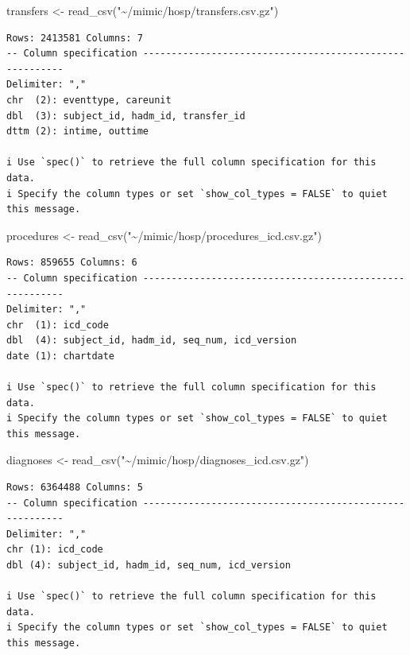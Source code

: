\documentclass[
]{article}
\newenvironment{Shaded}{\begin{snugshade}}{\end{snugshade}}
\newcommand{\FunctionTok}[1]{\textcolor[rgb]{0.00,0.00,0.00}{#1}}
\newcommand{\NormalTok}[1]{\textcolor[rgb]{0.00,0.00,0.00}{#1}}
\newcommand{\OtherTok}[1]{\textcolor[rgb]{0.56,0.35,0.01}{#1}}
\newcommand{\StringTok}[1]{\textcolor[rgb]{0.31,0.60,0.02}{#1}}
\begin{document}
\begin{Shaded}
\begin{Highlighting}[]
\NormalTok{transfers }\OtherTok{\textless{}{-}} \FunctionTok{read\_csv}\NormalTok{(}\StringTok{"\textasciitilde{}/mimic/hosp/transfers.csv.gz"}\NormalTok{)}
\end{Highlighting}
\end{Shaded}

\begin{verbatim}
Rows: 2413581 Columns: 7
-- Column specification --------------------------------------------------------
Delimiter: ","
chr  (2): eventtype, careunit
dbl  (3): subject_id, hadm_id, transfer_id
dttm (2): intime, outtime

i Use `spec()` to retrieve the full column specification for this data.
i Specify the column types or set `show_col_types = FALSE` to quiet this message.
\end{verbatim}

\begin{Shaded}
\begin{Highlighting}[]
\NormalTok{procedures }\OtherTok{\textless{}{-}} \FunctionTok{read\_csv}\NormalTok{(}\StringTok{"\textasciitilde{}/mimic/hosp/procedures\_icd.csv.gz"}\NormalTok{)}
\end{Highlighting}
\end{Shaded}

\begin{verbatim}
Rows: 859655 Columns: 6
-- Column specification --------------------------------------------------------
Delimiter: ","
chr  (1): icd_code
dbl  (4): subject_id, hadm_id, seq_num, icd_version
date (1): chartdate

i Use `spec()` to retrieve the full column specification for this data.
i Specify the column types or set `show_col_types = FALSE` to quiet this message.
\end{verbatim}

\begin{Shaded}
\begin{Highlighting}[]
\NormalTok{diagnoses }\OtherTok{\textless{}{-}} \FunctionTok{read\_csv}\NormalTok{(}\StringTok{"\textasciitilde{}/mimic/hosp/diagnoses\_icd.csv.gz"}\NormalTok{)}
\end{Highlighting}
\end{Shaded}

\begin{verbatim}
Rows: 6364488 Columns: 5
-- Column specification --------------------------------------------------------
Delimiter: ","
chr (1): icd_code
dbl (4): subject_id, hadm_id, seq_num, icd_version

i Use `spec()` to retrieve the full column specification for this data.
i Specify the column types or set `show_col_types = FALSE` to quiet this message.
\end{verbatim}
\end{document}
